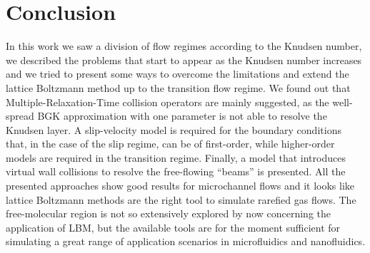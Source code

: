 \section{Conclusion}
In this work we saw a division of flow regimes according to the Knudsen number,
we described the problems that start to appear as the Knudsen number increases
and we tried to present some ways to overcome the limitations and extend the lattice
Boltzmann method up to the transition flow regime. We found out that Multiple-Relaxation-Time
collision operators are mainly suggested, as the well-spread BGK approximation
with one parameter is not able to resolve the Knudsen layer. A slip-velocity 
model is required for the boundary conditions that, in the case of the slip regime, 
can be of first-order, while higher-order models are required in the transition regime. 
Finally, a model that introduces virtual wall collisions to resolve the
free-flowing ``beams'' is presented. All the presented approaches show good results
for microchannel flows and it looks like lattice Boltzmann methods are the right
tool to simulate rarefied gas flows. The free-molecular region is not so extensively
explored by now concerning the application of LBM, but the available tools are
for the moment sufficient for simulating a great range of application scenarios
in microfluidics and nanofluidics. 